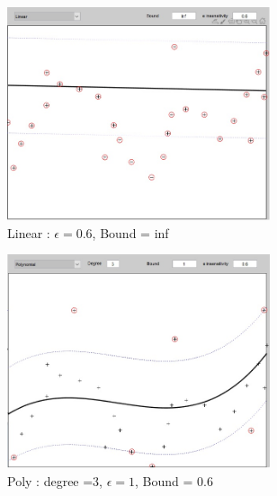 \begin{figure}[ht]
	\centering
	\begin{subfigure}[b]{0.35\textwidth}
		\centering
		\captionsetup{width=0.8\linewidth}
		\includegraphics[width = 0.85\textwidth]{Exercise2/Report/Ex2.1_E=0.6_B=inf}
		\caption{Linear : $\epsilon = 0.6$, Bound = inf }\label{fig:lin_E=0.6_B=inf}
	\end{subfigure}%
	\begin{subfigure}[b]{0.35\textwidth}
		\centering
		\captionsetup{width=0.8\linewidth}
		\includegraphics[width = 0.85\textwidth]{Exercise2/Report/Ex2.1_Poly_deg=3_E=1_B=0.6}
		\caption{Poly : degree =3, $\epsilon = 1$, Bound = 0.6 }\label{fig:Poly_deg=3_E=1_B=0.6}
	\end{subfigure}%
	\begin{subfigure}[b]{0.35\textwidth}
		\centering
		\captionsetup{width=0.8\linewidth}

\end{subfigure}
\end{figure}
